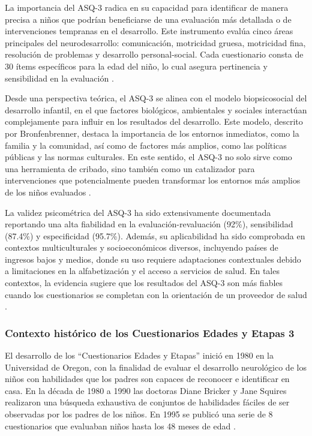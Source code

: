 La importancia del ASQ-3 radica en su capacidad para identificar de manera
precisa a niños que podrían beneficiarse de una evaluación más detallada o de
intervenciones tempranas en el desarrollo. Este instrumento evalúa cinco áreas
principales del neurodesarrollo: comunicación, motricidad gruesa, motricidad
fina, resolución de problemas y desarrollo personal-social. Cada cuestionario
consta de 30 ítems específicos para la edad del niño, lo cual asegura
pertinencia y sensibilidad en la evaluación \cite{squires2009ages}.

Desde una perspectiva teórica, el ASQ-3 se alinea con el modelo
biopsicosocial del desarrollo infantil, en el que factores biológicos,
ambientales y sociales interactúan complejamente para influir en los
resultados del desarrollo. Este modelo, descrito por Bronfenbrenner, destaca la
importancia de los entornos inmediatos, como la familia y la comunidad, así
como de factores más amplios, como las políticas públicas y las normas
culturales. En este sentido, el ASQ-3 no solo sirve como una herramienta de
cribado, sino también como un catalizador para intervenciones que
potencialmente pueden transformar los entornos más amplios de los niños
evaluados \cite{Feldman3, Bronfenbrenner2005}.

La validez psicométrica del ASQ-3 ha sido extensivamente documentada reportando
una alta fiabilidad en la evaluación-revaluación (92\%), sensibilidad (87.4\%)
y especificidad (95.7\%). Además, su aplicabilidad ha sido comprobada en
contextos multiculturales y socioeconómicos diversos, incluyendo países de
ingresos bajos y medios, donde su uso requiere adaptaciones contextuales debido
a limitaciones en la alfabetización y el acceso a servicios de salud. En tales
contextos, la evidencia sugiere que los resultados del ASQ-3 son más fiables
cuando los cuestionarios se completan con la orientación de un proveedor de
salud \cite{Vameghi2013-uo, SarmientoCampos2010, Manasyan2023}.

\subsubsection{Contexto histórico de los Cuestionarios Edades y Etapas 3}
El desarrollo de los ``Cuestionarios Edades y Etapas'' inició en 1980 en la
Universidad de Oregon, con la finalidad de evaluar el desarrollo neurológico de
los niños con habilidades que los padres son capaces de reconocer e identificar
en casa. En la década de 1980 a 1990 las doctoras Diane Bricker y Jane Squires
realizaron una búsqueda exhaustiva de conjuntos de habilidades fáciles de ser
observadas por los padres de los niños. En 1995 se publicó una serie de 8
cuestionarios que evaluaban niños hasta los 48 meses de edad \cite{ASQ4decades}.

